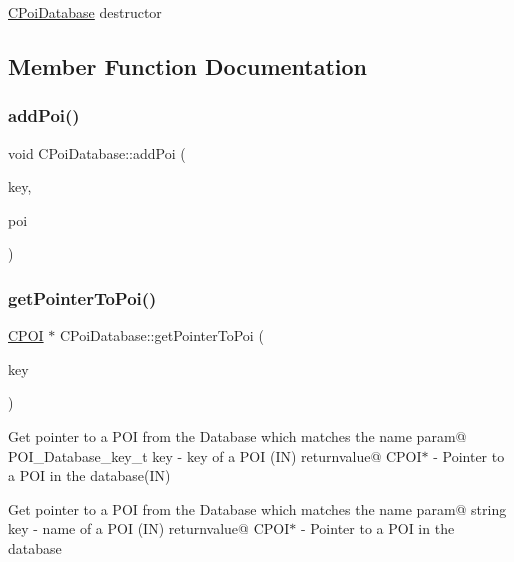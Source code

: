\hyperlink{classCPoiDatabase}{C\+Poi\+Database} destructor 

\subsection{Member Function Documentation}
\mbox{\label{classCPoiDatabase_a963761cbbaf6ad8f249d5950b428f7eb}} 
\subsubsection{\texorpdfstring{add\+Poi()}{addPoi()}}
{\footnotesize\ttfamily void C\+Poi\+Database\+::add\+Poi (\begin{DoxyParamCaption}\item[{\hyperlink{CPoiDatabase_8h_ad55418fc31c1491ccfbd50da54f494a0}{P\+O\+I\+\_\+\+Database\+\_\+key\+\_\+t} const \&}]{key,  }\item[{\hyperlink{classCPOI}{C\+P\+OI} const \&}]{poi }\end{DoxyParamCaption})}

\mbox{\label{classCPoiDatabase_a4320809ce8b8f2cb6d3a9e56d598293c}} 
\subsubsection{\texorpdfstring{get\+Pointer\+To\+Poi()}{getPointerToPoi()}}
{\footnotesize\ttfamily \hyperlink{classCPOI}{C\+P\+OI} $\ast$ C\+Poi\+Database\+::get\+Pointer\+To\+Poi (\begin{DoxyParamCaption}\item[{\hyperlink{CPoiDatabase_8h_ad55418fc31c1491ccfbd50da54f494a0}{P\+O\+I\+\_\+\+Database\+\_\+key\+\_\+t}}]{key }\end{DoxyParamCaption})}

Get pointer to a P\+OI from the Database which matches the name param@ P\+O\+I\+\_\+\+Database\+\_\+key\+\_\+t key -\/ key of a P\+OI (IN) returnvalue@ C\+P\+O\+I$\ast$ -\/ Pointer to a P\+OI in the database(\+I\+N)

Get pointer to a P\+OI from the Database which matches the name param@ string key -\/ name of a P\+OI (IN) returnvalue@ C\+P\+O\+I$\ast$ -\/ Pointer to a P\+OI in the database \mbox{\label{classCPoiDatabase_a3f5c6705e35e3f543d60fc0ddf9334a8}} 
